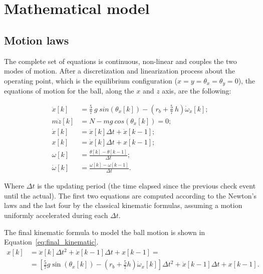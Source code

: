 \section{Mathematical model}
\label{sec:math}

\subsection{Motion laws}
\label{sec:motion}

The complete set of equations is continuous, non-linear and couples the two modes
of motion. After a discretization and linearization process about the operating
point, which is the equilibrium configuration
($x = y = \theta_x = \theta_y = 0$), the equations of motion for the ball,
along the $x$ and $z$ axis, are the following:

\begin{align*}
\ddot{x}[k] &= \frac{5}{7}\ g\ sin (\theta_x[k]) - \left ( r_b + \frac{5}{7}\ h \right ) \dot{\omega}_x[k];\\
m\ddot{z}[k] &= N - mg\ cos(\theta_x[k]) = 0;\\
\dot{x}[k] &= \ddot{x}[k] \Delta t + \dot{x}[k-1];\\
x[k] &= \dot{x}[k] \Delta t + x[k-1];\\
\omega[k] &= \frac{ \theta[k] - \theta[k-1] } {\Delta t};\\
\dot{\omega}[k] &= \frac{ \omega[k] - \omega[k-1] } {\Delta t}.
\label{eq:kinematic}
\end{align*}

Where $\Delta t$ is the updating period (the time elapsed since the previous
check event until the actual). The first two equations are computed
according to the Newton's laws and the last four by the classical kinematic
formulas, assuming a motion uniformly accelerated during each $\Delta t$.

The final kinematic formula to model the ball motion is shown in
Equation~\ref{eq:final_kinematic}.
\begin{equation}
\begin{aligned}
	x[k] &= \ddot{x}[k] \Delta t^2 + \dot{x}[k-1] \Delta t + x[k-1] =\\
		 &= \left[ \frac{5}{7}g \sin(\theta_x[k]) - \left( r_b + \frac{5}{7} h \right) \dot{\omega}_x[k] \right] \Delta t^2 +
			\dot{x}[k-1] \Delta t + x[k-1].
\end{aligned}
\label{eq:final_kinematic}
\end{equation}

